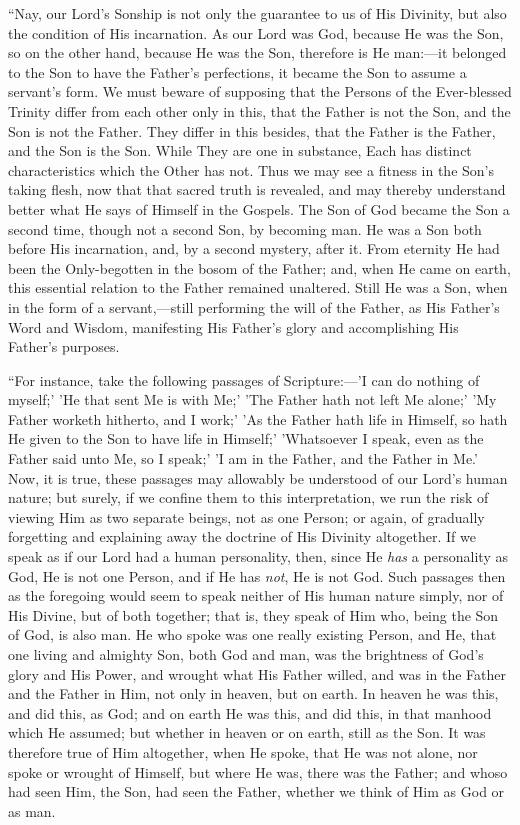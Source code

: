 ``Nay, our Lord's Sonship is not only the guarantee to us of
His Divinity, but also the condition of His incarnation. As our Lord
was God, because He was the Son, so on the other hand, because He was
the Son, therefore is He man:—it belonged to the Son to have the
Father's perfections, it became the Son to assume a servant's form. We
must beware of supposing that the Persons of the Ever-blessed Trinity
differ from each other only in this, that the Father is not the Son,
and the Son is not the Father. They differ in this besides, that the
Father is the Father, and the Son is the Son. While They are one in
substance, Each has distinct characteristics which the Other has not.
Thus we may see a fitness in the Son's taking flesh, now that that
sacred truth is revealed, and may thereby understand better what He
says of Himself in the Gospels. The Son of God became the Son a
second time, though not a second Son, by becoming man. He was a Son
both before His incarnation, and, by a second mystery, after it. From
eternity He had been the Only-begotten in the bosom of the Father;
and, when He came on earth, this essential relation to the Father
remained unaltered. Still He was a Son, when in the form of a servant,—still
performing the will of the Father, as His Father's Word and Wisdom,
manifesting His Father's glory and accomplishing His Father's
purposes.

``For instance, take the following passages of Scripture:—'I
can do nothing of myself;' 'He that sent Me is with Me;' 'The Father
hath not left Me alone;' 'My Father worketh hitherto, and I work;' 'As
the Father hath life in Himself, so hath He given to the Son to have
life in Himself;' 'Whatsoever I speak, even as the Father said unto
Me, so I speak;' 'I am in the Father, and the Father in Me.' Now, it
is true, these passages may allowably be understood of our Lord's
human nature; but surely, if we confine them to this interpretation,
we run the risk of viewing Him as two separate beings, not as one
Person; or again, of gradually forgetting and explaining away the
doctrine of His Divinity altogether. If we speak as if our Lord had a
human personality, then, since He \emph{has} a personality as God, He
is not one Person, and if He has \emph{not}, He is not God. Such
passages then as the foregoing would seem to speak neither of His
human nature simply, nor of His Divine, but of both together; that is,
they speak of Him who, being the Son of God, is also man. He who spoke
was one really existing Person, and He, that one living and
almighty Son, both God and man, was the brightness of God's glory and
His Power, and wrought what His Father willed, and was in the Father
and the Father in Him, not only in heaven, but on earth. In heaven he
was this, and did this, as God; and on earth He was this, and did
this, in that manhood which He assumed; but whether in heaven or on
earth, still as the Son. It was therefore true of Him altogether, when
He spoke, that He was not alone, nor spoke or wrought of Himself, but
where He was, there was the Father; and whoso had seen Him, the Son,
had seen the Father, whether we think of Him as God or as man.

